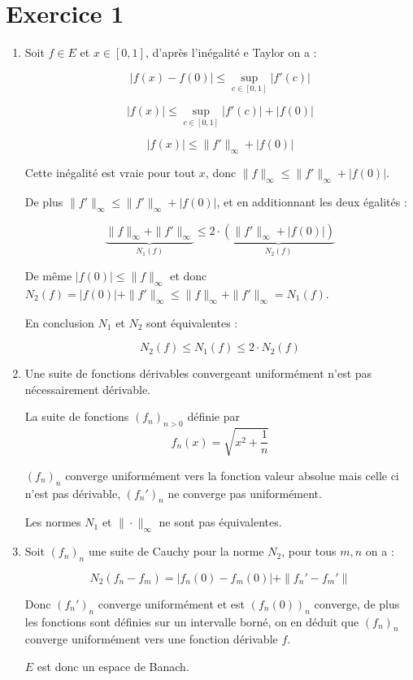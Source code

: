 \documentclass[]{article}
\theoremstyle{remark}
\theoremstyle{definition}
\begin{document}
\section*{Exercice 1}

\begin{enumerate}
	\item Soit $f \in E$ et $x \in [0, 1]$, d'après l'inégalité e Taylor on a :
	
	$$|f(x) - f(0)| \leqslant\sup_{c \in [0, 1]}|f'(c)|$$
	
	$$|f(x)| \leqslant\sup_{c \in [0, 1]}|f'(c)| + |f(0)|$$
	
	$$|f(x)| \leqslant \|f'\|_{\infty} + |f(0)|$$
	
	Cette inégalité est vraie pour tout $x$, donc $\|f\|_{\infty}\leqslant \|f'\|_{\infty} + |f(0)|$.
	
	De plus $\|f'\|_{\infty} \leqslant \|f'\|_{\infty} + |f(0)|$, et en additionnant les deux égalités :
	
	$$\underbrace{\|f\|_{\infty}+\|f'\|_{\infty}}_{N_1(f)} \leqslant 2 \cdot \underbrace{(\|f'\|_{\infty}+|f(0)|)}_{N_2(f)}$$
	
	De même $|f(0)| \leqslant \|f\|_{\infty}$ et donc $N_2(f) = |f(0)| + \|f'\|_{\infty} \leqslant \|f\|_{\infty} + \|f'\|_{\infty} = N_1(f)$.
	
	En conclusion $N_1$ et $N_2$ sont équivalentes :
	
	$$N_2(f) \leqslant N_1(f) \leqslant 2 \cdot N_2(f)$$
	
	\item Une suite de fonctions dérivables convergeant uniformément n'est pas nécessairement dérivable.
	
	La suite de fonctions $(f_n)_{n > 0}$ définie par $$f_n(x) = \sqrt{x^2 + \frac{1}{n}}$$
	
	$(f_n)_n$ converge uniformément vers la fonction valeur absolue mais celle ci n'est pas dérivable, $(f_n')_n$ ne converge pas uniformément.
	
	Les normes $N_1$ et $\|\cdot\|_{\infty}$ ne sont pas équivalentes.
	
	\item Soit $(f_n)_n$ une suite de Cauchy pour la norme $N_2$, pour tous $m, n$ on a :
	
	$$N_2(f_n - f_m) = |f_n(0) - f_m(0)| + \|f_n' - f_m'\|$$
	
	Donc $(f_n')_n$ converge uniformément et est $(f_n(0))_n$ converge, de plus les fonctions sont définies sur un intervalle borné, on en déduit que $(f_n)_n$converge uniformément vers une fonction dérivable $f$.
	
	$E$ est donc un espace de Banach.
\end{enumerate}
\end{document}
